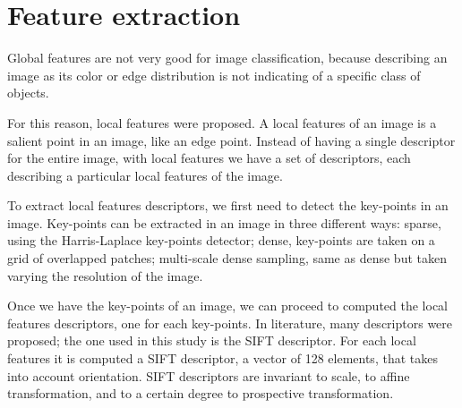 \section{Feature extraction}



Global features are not very good for image classification, because describing an image as its color or edge distribution is not indicating of a specific class of objects.

For this reason, local features were proposed. A local features of an image is a salient point in an image, like an edge point. Instead of having a single descriptor for the entire image, with local features we have a set of descriptors, each describing a particular local features of the image.

To extract local features descriptors, we first need to detect the key-points in an image.
Key-points can be extracted in an image in three different ways: sparse, using the Harris-Laplace key-points detector; dense, key-points are taken on a grid of overlapped patches; multi-scale dense sampling, same as dense but taken varying the resolution of the image.

Once we have the key-points of an image, we can proceed to computed the local features descriptors, one for each key-points. In literature, many descriptors were proposed; the one used in this study is the SIFT descriptor. For each local features it is computed a SIFT descriptor, a vector of 128 elements, that takes into account orientation. SIFT descriptors are invariant to scale, to affine transformation, and to a certain degree to prospective transformation.